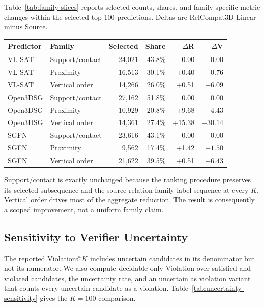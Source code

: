 Table~\ref{tab:family-slices} reports selected counts, shares, and family-specific metric changes within the selected top-100 predictions. Deltas are RelCompat3D-Linear minus Source.

\begin{center}
\centering
{\small
\setlength{\tabcolsep}{2.5pt}
\begin{tabular}{llrrrr}
\toprule
Predictor & Family & Selected & Share & $\Delta$R & $\Delta$V \\
\midrule
VL-SAT & Support/contact & 24,021 & 43.8\% & 0.00 & 0.00 \\
VL-SAT & Proximity & 16,513 & 30.1\% & +0.40 & $-0.76$ \\
VL-SAT & Vertical order & 14,266 & 26.0\% & +0.51 & $-6.09$ \\
\midrule
Open3DSG & Support/contact & 27,162 & 51.8\% & 0.00 & 0.00 \\
Open3DSG & Proximity & 10,929 & 20.8\% & +9.68 & $-4.43$ \\
Open3DSG & Vertical order & 14,361 & 27.4\% & +15.38 & $-30.14$ \\
\midrule
SGFN & Support/contact & 23,616 & 43.1\% & 0.00 & 0.00 \\
SGFN & Proximity & 9,562 & 17.4\% & +1.42 & $-1.50$ \\
SGFN & Vertical order & 21,622 & 39.5\% & +0.51 & $-6.43$ \\
\bottomrule
\end{tabular}
}
\label{tab:family-slices}
\end{center}

Support/contact is exactly unchanged because the ranking procedure preserves its selected subsequence and the source relation-family label sequence at every $K$. Vertical order drives most of the aggregate reduction. The result is consequently a scoped improvement, not a uniform family claim.

\subsection{Sensitivity to Verifier Uncertainty}

The reported Violation@$K$ includes uncertain candidates in its denominator but not its numerator. We also compute decidable-only Violation over satisfied and violated candidates, the uncertainty rate, and an uncertain as violation variant that counts every uncertain candidate as a violation.
Table~\ref{tab:uncertainty-sensitivity} gives the $K=100$ comparison.

